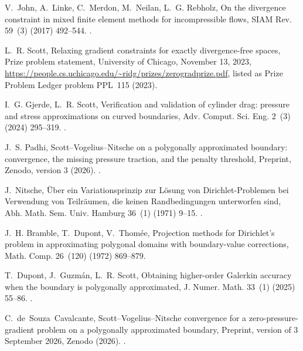 \documentclass[5p,times]{elsarticle}
\theoremstyle{definition}
\begin{document}
V.~John, A.~Linke, C.~Merdon, M.~Neilan, L.~G. Rebholz, On the divergence
  constraint in mixed finite element methods for incompressible flows, SIAM
  Rev. 59~(3) (2017) 492--544.
\newblock \href {https://doi.org/10.1137/15M1047696}
  {}.

L.~R. Scott, Relaxing gradient constraints for exactly divergence-free spaces,
  Prize problem statement, University of Chicago, November 13, 2023,
  \url{https://people.cs.uchicago.edu/~ridg/prizes/zerogradprize.pdf}, listed
  as Prize Problem Ledger problem PPL~115 (2023).

I.~G. Gjerde, L.~R. Scott, Verification and validation of cylinder drag:
  pressure and stress approximations on curved boundaries, Adv. Comput. Sci.
  Eng. 2~(3) (2024) 295--319.
\newblock \href {https://doi.org/10.3934/acse.2024015}
  {}.

J.~S. Padhi, {S}cott--{V}ogelius--{N}itsche on a polygonally approximated
  boundary: convergence, the missing pressure traction, and the penalty
  threshold, Preprint, Zenodo, version 3 (2026).
\newblock \href {https://doi.org/10.5281/zenodo.23044296}
  {}.

J.~Nitsche, \"{U}ber ein {V}ariationsprinzip zur {L}\"osung von
  {D}irichlet-{P}roblemen bei {V}erwendung von {T}eilr\"aumen, die keinen
  {R}andbedingungen unterworfen sind, Abh. Math. Sem. Univ. Hamburg 36~(1)
  (1971) 9--15.
\newblock \href {https://doi.org/10.1007/BF02995904}
  {}.

J.~H. Bramble, T.~Dupont, V.~Thom\'ee, Projection methods for {D}irichlet's
  problem in approximating polygonal domains with boundary-value corrections,
  Math. Comp. 26~(120) (1972) 869--879.

T.~Dupont, J.~Guzm\'an, L.~R. Scott, Obtaining higher-order {G}alerkin accuracy
  when the boundary is polygonally approximated, J. Numer. Math. 33~(1) (2025)
  55--86.
\newblock \href {https://doi.org/10.1515/jnma-2023-0135}
  {}.

C.~de~Souza~Cavalcante, {S}cott--{V}ogelius--{N}itsche convergence for a
  zero-pressure-gradient problem on a polygonally approximated boundary,
  Preprint, version of 3 September 2026, Zenodo (2026).
\newblock \href {https://doi.org/10.5281/zenodo.22262466}
  {}.
\end{document}
